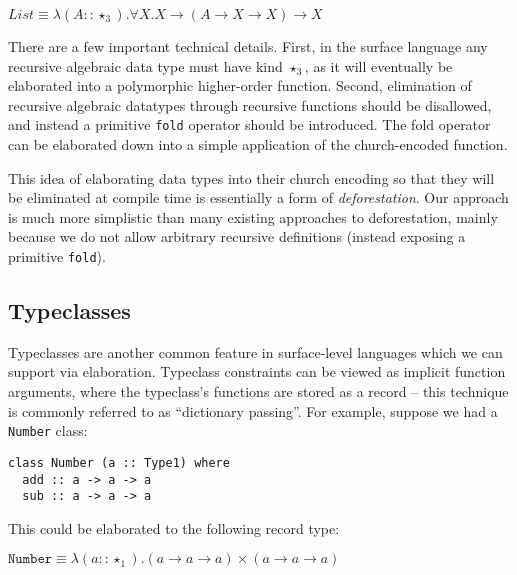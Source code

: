 \documentclass[runningheads]{llncs}
\begin{document}
$List \equiv \lambda (A :: \star_3). \forall X. X \rightarrow (A \rightarrow X \rightarrow X) \rightarrow X$

There are a few important technical details. First, in the surface language any recursive algebraic data type must have kind $\star_3$, as it will eventually be elaborated into a polymorphic higher-order function. Second, elimination of recursive algebraic datatypes through recursive functions should be disallowed, and instead a primitive \texttt{fold} operator should be introduced. The fold operator can be elaborated down into a simple application of the church-encoded function.

This idea of elaborating data types into their church encoding so that they will be eliminated at compile time is essentially a form of \emph{deforestation}\cite{wadler1988deforestation}. Our approach is much more simplistic than many existing approaches to deforestation, mainly because we do not allow arbitrary recursive definitions (instead exposing a primitive \texttt{fold}).




\subsection{Typeclasses} \label{sec:typeclasses}

Typeclasses are another common feature in surface-level languages which we can support via elaboration. Typeclass constraints can be viewed as implicit function arguments, where the typeclass's functions are stored as a record -- this technique is commonly referred to as ``dictionary passing''. For example, suppose we had a \texttt{Number} class:

\begin{verbatim}
class Number (a :: Type1) where
  add :: a -> a -> a
  sub :: a -> a -> a
\end{verbatim}

This could be elaborated to the following record type:

$\texttt{Number} \equiv \lambda (a :: \star_1). (a \rightarrow a \rightarrow a) \times (a \rightarrow a \rightarrow a)$
\end{document}
